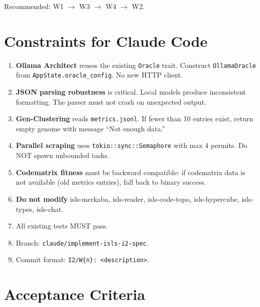 \documentclass[11pt,a4paper]{article}
\begin{document}
Recommended: W1 $\to$ W3 $\to$ W4 $\to$ W2.


\section{Constraints for Claude Code}

\begin{enumerate}
\item \textbf{Ollama Architect} reuses the existing \texttt{Oracle} 
      trait. Construct \texttt{OllamaOracle} from 
      \texttt{AppState.oracle\_config}. No new HTTP client.
\item \textbf{JSON parsing robustness} is critical. Local models 
      produce inconsistent formatting. The parser must not crash 
      on unexpected output.
\item \textbf{Gen-Clustering} reads \texttt{metrics.jsonl}. If 
      fewer than 10 entries exist, return empty genome with 
      message ``Not enough data.''
\item \textbf{Parallel scraping} uses \texttt{tokio::sync::Semaphore} 
      with max 4 permits. Do NOT spawn unbounded tasks.
\item \textbf{Codematrix fitness} must be backward compatible: if 
      codematrix data is not available (old metrics entries), 
      fall back to binary success.
\item \textbf{Do not modify} isls-merkaba, isls-reader, 
      isls-code-topo, isls-hypercube, isls-types, isls-chat.
\item All existing tests MUST pass.
\item Branch: \texttt{claude/implement-isls-i2-spec}.
\item Commit format: \texttt{I2/W\{n\}: <description>}.
\end{enumerate}


\section{Acceptance Criteria}
\end{document}

